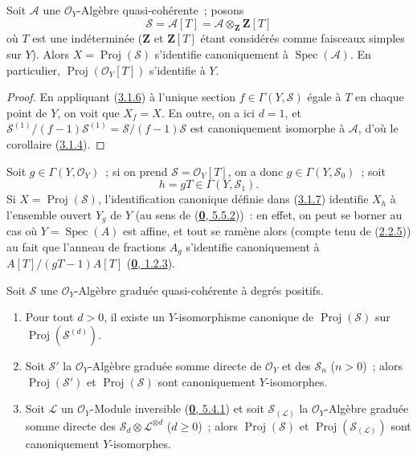 \begin{corollary}[3.1.7]
\label{II.3.1.7-fr}
Soit $\mathcal{A}$ une $\mathcal{O}_Y$-Algèbre quasi-cohérente~; posons
\[
  \mathcal{S}=\mathcal{A}[T]
  =\mathcal{A}\otimes_{\mathbf{Z}}\mathbf{Z}[T]
\]
où $T$ est une indéterminée ($\mathbf{Z}$ et $\mathbf{Z}[T]$ étant
considérés comme faisceaux simples sur $Y$). Alors
$X=\operatorname{Proj}(\mathcal{S})$ s'identifie canoniquement à
$\operatorname{Spec}(\mathcal{A})$. En particulier,
$\operatorname{Proj}(\mathcal{O}_Y[T])$ s'identifie à $Y$.
\end{corollary}

\begin{proof}
En appliquant (\hyperref[II.3.1.6-fr]{3.1.6}) à l'unique section
$f\in\Gamma(Y,\mathcal{S})$ égale à $T$ en chaque point de $Y$, on voit que
$X_f=X$. En outre, on a ici $d=1$, et
$\mathcal{S}^{(1)}/(f-1)\mathcal{S}^{(1)}
=\mathcal{S}/(f-1)\mathcal{S}$ est canoniquement isomorphe à $\mathcal{A}$,
d'où le corollaire (\hyperref[II.3.1.4-fr]{3.1.4}).
\end{proof}

Soit $g\in\Gamma(Y,\mathcal{O}_Y)$~; si on prend
$\mathcal{S}=\mathcal{O}_Y[T]$, on a donc $g\in\Gamma(Y,\mathcal{S}_0)$~; soit
\[
  h=gT\in\Gamma(Y,\mathcal{S}_1).
\]
Si $X=\operatorname{Proj}(\mathcal{S})$, l'identification canonique définie
dans (\hyperref[II.3.1.7-fr]{3.1.7}) identifie $X_h$ à l'ensemble ouvert
$Y_g$ de $Y$ (au sens de (\hyperref[0.5.5.2-fr]{\textbf{0}, 5.5.2}))~: en effet, on
peut se borner au cas où $Y=\operatorname{Spec}(A)$ est affine, et tout se
ramène alors (compte tenu de (\hyperref[II.2.2.5-fr]{2.2.5})) au fait que
l'anneau de fractions $A_g$ s'identifie canoniquement à
$A[T]/(gT-1)A[T]$ (\hyperref[0.1.2.3-fr]{\textbf{0}, 1.2.3}).

\begin{proposition}[3.1.8]
\label{II.3.1.8-fr}
Soit $\mathcal{S}$ une $\mathcal{O}_Y$-Algèbre graduée quasi-cohérente à
degrés positifs.
\begin{enumerate}
  \item[\rm(i)] Pour tout $d>0$, il existe un $Y$-isomorphisme canonique de
    $\operatorname{Proj}(\mathcal{S})$ sur
    $\operatorname{Proj}(\mathcal{S}^{(d)})$.


  \item[\rm(ii)] Soit $\mathcal{S}'$ la $\mathcal{O}_Y$-Algèbre graduée
    somme directe de $\mathcal{O}_Y$ et des $\mathcal{S}_n$ ($n>0$)~;
    alors $\operatorname{Proj}(\mathcal{S}')$ et
    $\operatorname{Proj}(\mathcal{S})$ sont canoniquement $Y$-isomorphes.
  \item[\rm(iii)] Soit $\mathcal{L}$ un $\mathcal{O}_Y$-Module inversible
    \textup{(\hyperref[0.5.4.1-fr]{\textbf{0}, 5.4.1})} et soit $\mathcal{S}_{(\mathcal{L})}$ la
    $\mathcal{O}_Y$-Algèbre graduée somme directe des
    $\mathcal{S}_d\otimes\mathcal{L}^{\otimes d}$ ($d\geq0$)~; alors
    $\operatorname{Proj}(\mathcal{S})$ et
    $\operatorname{Proj}(\mathcal{S}_{(\mathcal{L})})$ sont canoniquement
    $Y$-isomorphes.
\end{enumerate}
\end{proposition}

